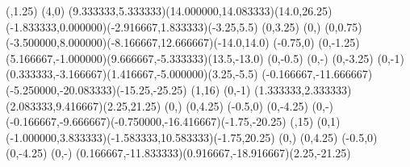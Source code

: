 {    \closepath
    \moveto(,1.25)
    \rlineto(4,0)
    \rcurveto(9.333333,5.333333)(14.000000,14.083333)(14.0,26.25)
    \rcurveto(-1.833333,0.000000)(-2.916667,1.833333)(-3.25,5.5)
    \rlineto(0,3.25)
    \rlineto(0,) %
    \rlineto(0,0.75)
    \rcurveto(-3.500000,8.000000)(-8.166667,12.666667)(-14.0,14.0)
    \rlineto(-0.75,0)
    \rlineto(0,-1.25)
    \rcurveto(5.166667,-1.000000)(9.666667,-5.333333)(13.5,-13.0)
    \rlineto(0,-0.5)
    \rlineto(0,-) %
    \rlineto(0,-3.25)
    \rlineto(0,-1)
    \rcurveto(0.333333,-3.166667)(1.416667,-5.000000)(3.25,-5.5)
    \rcurveto(-0.166667,-11.666667)(-5.250000,-20.083333)(-15.25,-25.25)
    \closepath
    \moveto(1,16)
    \rlineto(0,-1)
    \rcurveto(1.333333,2.333333)(2.083333,9.416667)(2.25,21.25)
    \rlineto(0,) %
    \rlineto(0,4.25)
    \rlineto(-0.5,0)
    \rlineto(0,-4.25)
    \rlineto(0,-) %
    \rcurveto(-0.166667,-9.666667)(-0.750000,-16.416667)(-1.75,-20.25)
    \closepath
    \moveto(,15)
    \rlineto(0,1)
    \rcurveto(-1.000000,3.833333)(-1.583333,10.583333)(-1.75,20.25)
    \rlineto(0,) %
    \rlineto(0,4.25)
    \rlineto(-0.5,0)
    \rlineto(0,-4.25)
    \rlineto(0,-) %
    \rcurveto(0.166667,-11.833333)(0.916667,-18.916667)(2.25,-21.25)
    \closepath
}
\newcommand{\pixieOutlinedSectionFancyBottomDownBackground}[2]{
	\moveto(0,5.25)
	\rcurveto(4,-1.3333)(6,-3.0833)(6,-5.25)
	\rlineto(8.75,0)
	\rlineto(\fpeval{max(#1,\pixieOSfancyBottombaseWidth)-\pixieOSfancyBottombaseWidth},0) %
	\rlineto(8.75,0)
	\rcurveto(0,2.1667)(2,3.9167)(6,5.25)
	\rlineto(0,31)
	\rlineto(0,\fpeval{max(#2,\pixieOSfancyBottombaseHeight)-\pixieOSfancyBottombaseHeight}) %
	\rlineto(0,9.5)
	\rcurveto(-4,1.3333)(-6,3.0833)(-6,5.25)
	\rlineto(-8.75,0)
	\rlineto(-\fpeval{max(#1,\pixieOSfancyBottombaseWidth)-\pixieOSfancyBottombaseWidth},0) %
	\rlineto(-8.75,0)
	\rcurveto(0,-2.1667)(-2,-3.9167)(-6,-5.25)
	\rlineto(0,-9.5)
	\rlineto(0,-\fpeval{max(#2,\pixieOSfancyBottombaseHeight)-\pixieOSfancyBottombaseHeight}) %
	\closepath
}
